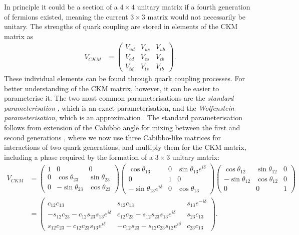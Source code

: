\documentclass[a4paper,12pt]{article}
\begin{document}
In principle it could be a section of a $4\times4$ unitary matrix if a fourth generation of fermions existed, meaning the current $3\times3$ matrix would not necessarily be unitary. 
The strengths of quark coupling are stored in elements of the CKM matrix as
\begin{align}
    \label{eq:ckmub}
    V_{CKM} &= \begin{pmatrix}V_{ud}&V_{us}&V_{ub}\\V_{cd}&V_{cs}&V_{cb}\\V_{td}&V_{ts}&V_{tb}\end{pmatrix}.
\end{align}
These individual elements can be found through quark coupling processes. 
For better understanding of the CKM matrix, however, it can be easier to parameterise it. 
The two most common parameterisations are the \emph{standard parameterisation} \cite{pdg}, which is an exact parameterisation, and the \emph{Wolfenstein parameterisation}, which is an approximation \cite{wolf}.
The standard parameterisation follows from extension of the Cabibbo angle for mixing between the first and second generations \cite{cabibbo}, where we now use three Cabibbo-like matrices for interactions of two quark generations, and multiply them for the CKM matrix, including a phase required by the formation of a $3\times3$ unitary matrix:
\begin{equation}
    \label{eq:standpar}
    \begin{split}
        V_{CKM} &= \begin{pmatrix}1&0&0\\0&\cos\theta_{23}&\sin\theta_{23}\\0&-\sin\theta_{23}&\cos\theta_{23}\end{pmatrix}\begin{pmatrix}\cos\theta_{13}&0&\sin\theta_{13}e^{i\delta}\\0&1&0\\-\sin\theta_{13}e^{i\delta}&0&\cos\theta_{13}\end{pmatrix}\begin{pmatrix}\cos\theta_{12}&\sin\theta_{12}&0\\-\sin\theta_{12}&\cos\theta_{12}&0\\0&0&1\end{pmatrix}\\
                &= \begin{pmatrix}c_{12}c_{13} & s_{12}c_{13} & s_{13}e^{-i\delta} \\ -s_{12}c_{23}-c_{12}s_{23}s_{13}e^{i\delta} & c_{12}c_{23}-s_{12}s_{23}s_{13}e^{i\delta} & s_{23}c_{13} \\ s_{12}c_{23}-c_{12}c_{23}s_{13}e^{i\delta} & -c_{12}s_{23}-s_{12}c_{23}s_{12}e^{i\delta} & c_{23}c_{13}\end{pmatrix}.
    \end{split}
\end{equation}
\end{document}
